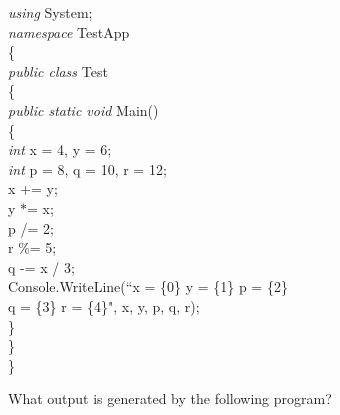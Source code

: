 {\begin{list}{E \thechapter.\theenumi}
\emph{using} System; \\
\emph{namespace} TestApp\\
\{\\
\hspace*{0.2in}    \emph{public class} Test\\
\hspace*{0.2in}    \{\\
\hspace*{0.4in}        \emph{public static void} Main()\\
\hspace*{0.4in}        \{\\
\hspace*{0.6in}            \emph{int} x = 4, y = 6;\\
\hspace*{0.6in}            \emph{int} p = 8, q = 10, r = 12;\\
\hspace*{0.6in}            x += y;\\
\hspace*{0.6in}            y $\ast$= x;\\
\hspace*{0.6in}            p /= 2;\\
\hspace*{0.6in}            r \%= 5;\\
\hspace*{0.6in}            q -= x / 3;\\
\hspace*{0.6in}            Console.WriteLine(``x = \{0\}  y =
\{1\} p = \{2\}  \\
\hspace*{0.8in} q = \{3\}  r = \{4\}", x, y, p, q, r);\\
\hspace*{0.4in}        \}\\
\hspace*{0.2in}    \}\\
\}



\item What output is generated by the following program?



\end{list}}
